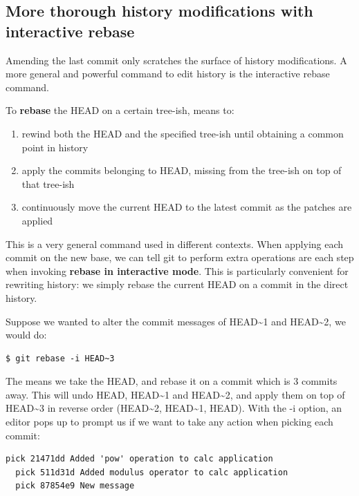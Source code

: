 \documentclass{../common/tufte-latex/tufte-handout}
\begin{document}
\subsection{More thorough history modifications with interactive rebase}
Amending the last commit only scratches the surface of history modifications.
A more general and powerful command to edit history is the interactive rebase command.

To \textbf{rebase} the HEAD on a certain tree-ish, means to:

\begin{enumerate} 
 \item{rewind both the HEAD and the specified tree-ish until obtaining a common point in history}
 \item{apply the commits belonging to HEAD, missing from the tree-ish on top of that tree-ish}
 \item{continuously move the current HEAD to the latest commit as the patches are applied}
\end{enumerate}

This is a very general command used in different contexts.
When applying each commit on the new base, we can tell git to perform extra operations are each step when invoking \textbf{rebase in interactive mode}.
This is particularly convenient for rewriting history: we simply rebase the current HEAD on a commit in the direct history.

Suppose we wanted to alter the commit messages of HEAD\textasciitilde1 and HEAD\textasciitilde2, we would do:
\begin{lstlisting}[style=BashInputStyle]
  $ git rebase -i HEAD~3
\end{lstlisting}

The means we take the HEAD, and rebase it on a commit which is 3 commits away.
This will undo HEAD, HEAD\textasciitilde1 and HEAD\textasciitilde2, and apply them on top of HEAD\textasciitilde3 in reverse order (HEAD\textasciitilde2, HEAD\textasciitilde1, HEAD).
With the -i option, an editor pops up to prompt us if we want to take any action when picking each commit:

\begin{lstlisting}[style=BashInputStyle]
  pick 21471dd Added 'pow' operation to calc application
  pick 511d31d Added modulus operator to calc application
  pick 87854e9 New message
\end{lstlisting}
\end{document}
